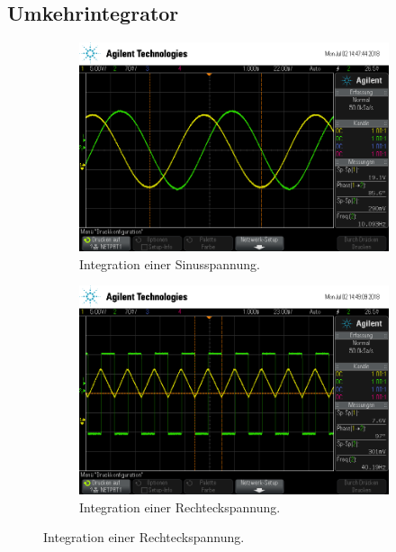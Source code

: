 \subsection{Umkehrintegrator}
\begin{figure}[ht]
  \centering
  
  \caption{}
  \label{fig:int}
\end{figure}
\begin{figure}[ht]
  \centering
  \begin{subfigure}[]{\textwidth}
    \centering
    \includegraphics[height=0.3\textheight]{data/scope_262.png}
    \caption{Integration einer Sinusspannung.}
    \label{subfig:int_sinus}
  \end{subfigure}
  \begin{subfigure}[]{\textwidth}
    \centering
    \includegraphics[height=0.3\textheight]{data/scope_263.png}
    \caption{Integration einer Rechteckspannung.}

\end{subfigure}
\end{figure}
